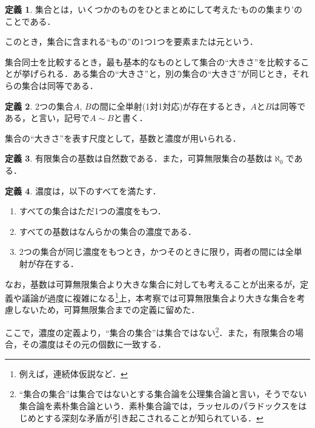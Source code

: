 \documentclass[10pt, a5paper, twoside]{jsarticle}
\theoremstyle{definition}
\newtheorem{dfn}{定義}
\begin{document}
			\begin{dfn}
				
				集合とは，いくつかのものをひとまとめにして考えた‘ものの集まり’のことである\cite{matsu}．

			\end{dfn}

			このとき，集合に含まれる“もの”の1つ1つを要素または元という．


			集合同士を比較するとき，最も基本的なものとして集合の“大きさ”を比較することが挙げられる．ある集合の“大きさ”と，別の集合の“大きさ”が同じとき，それらの集合は同等である．

			\begin{dfn}
				
				2つの集合$A$, $B$の間に全単射(1対1対応)が存在するとき，$A$と$B$は同等である，と言い，記号で$A \sim B$と書く\cite{hara}．

			\end{dfn}


			集合の“大きさ”を表す尺度として，基数と濃度が用いられる．

			\begin{dfn}
				
				有限集合の基数は自然数である．また，可算無限集合の基数は$\aleph_0$である．

			\end{dfn}

			\begin{dfn}

				濃度は，以下のすべてを満たす\cite{nlab}．
				
				\begin{enumerate}
					\item すべての集合はただ1つの濃度をもつ．
					\item すべての基数はなんらかの集合の濃度である．
					\item 2つの集合が同じ濃度をもつとき，かつそのときに限り，両者の間には全単射が存在する．
				\end{enumerate}

			\end{dfn}

			なお，基数は可算無限集合より大きな集合に対しても考えることが出来るが，定義や議論が過度に複雑になる\footnote{例えば，連続体仮説など．}上，本考察では可算無限集合より大きな集合を考慮しないため，可算無限集合までの定義に留めた．

			ここで，濃度の定義より，“集合の集合”は集合ではない\footnote{“集合の集合”は集合ではないとする集合論を公理集合論と言い，そうでない集合論を素朴集合論という．素朴集合論では，ラッセルのパラドックスをはじめとする深刻な矛盾が引き起こされることが知られている．}．また，有限集合の場合，その濃度はその元の個数に一致する．
\end{document}
